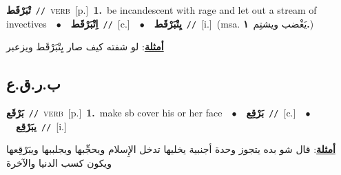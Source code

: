 \documentclass[10pt,a4paper,twoside]{article} %
\begin{document}
\begin{multicols}{2}
{\setlength\topsep{0pt}\textbf{\foreignlanguage{arabic}{تْبَرْقَط}}\ {\color{gray}\texttt{//}\color{black}}\ \textsc{verb}\ [p.]\ \textbf{1.}~be incandescent with rage and let out a stream of invectives\ \ $\bullet$\ \ \setlength\topsep{0pt}\textbf{\foreignlanguage{arabic}{اِتْبَرْقَط}}\ {\color{gray}\texttt{//}\color{black}}\ [c.]\ \ $\bullet$\ \ \setlength\topsep{0pt}\textbf{\foreignlanguage{arabic}{يِتْبَرْقَط}}\ {\color{gray}\texttt{//}\color{black}}\ [i.]\ \color{gray}(msa. \foreignlanguage{arabic}{يَغْضب ويشتِم}~\foreignlanguage{arabic}{\textbf{١.}})\color{black}\  \begin{flushright}\color{gray}\foreignlanguage{arabic}{\textbf{\underline{\foreignlanguage{arabic}{أمثلة}}}: لو شفته كيف صار يِتْبَرْقَط ويزعبر}\end{flushright}\color{black}} \vspace{2mm}

\vspace{-3mm}
\subsection*{\color{blue}\foreignlanguage{arabic}{ب.ر.ق.ع}\color{blue}{}} 

{\setlength\topsep{0pt}\textbf{\foreignlanguage{arabic}{بَرْقَع}}\ {\color{gray}\texttt{//}\color{black}}\ \textsc{verb}\ [p.]\ \textbf{1.}~make sb cover his or her face\ \ $\bullet$\ \ \setlength\topsep{0pt}\textbf{\foreignlanguage{arabic}{بَرْقِع}}\ {\color{gray}\texttt{//}\color{black}}\ [c.]\ \ $\bullet$\ \ \setlength\topsep{0pt}\textbf{\foreignlanguage{arabic}{يبَرْقِع}}\ {\color{gray}\texttt{//}\color{black}}\ [i.]\  \begin{flushright}\color{gray}\foreignlanguage{arabic}{\textbf{\underline{\foreignlanguage{arabic}{أمثلة}}}: قال شو بده يتجوز وحدة أجنبية يخليها تدخل الإِسلام ويحجِّبها ويجلببها ويبَرْقِعها ويكون كسب الدنيا والآخرة}\end{flushright}\color{black}} \vspace{2mm}


\end{multicols}
\end{document}
